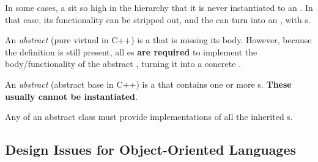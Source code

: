 In some cases, a  sit so high in the hierarchy that it is never instantiated to an .
In that case, its functionality can be stripped out, and the  can turn into an , with s.

\begin{definition}\label{def:OOP_Abstract_Method}
  An \emph{abstract } (pure virtual  in C++) is a  that is missing its body.
  However, because the  definition is still present, all es \textbf{are required} to implement the body/functionality of the abstract , turning it into a concrete .
\end{definition}

\begin{definition}\label{def:OOP_Abstract_Class}
  An \emph{abstract } (abstract base  in C++) is a  that contains one or more s.
  \textbf{These usually cannot be instantiated}.
  
  Any  of an abstract class must provide implementations of all the inherited s.
\end{definition}

\subsection{Design Issues for Object-Oriented Languages}\label{subsec:OOP_Design_Issues}
